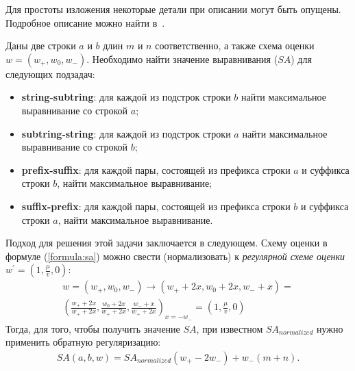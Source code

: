 Для простоты изложения некоторые детали при описании могут быть опущены.
Подробное описание можно найти в~\cite{alex2007semilocal}.


\begin{definition}
Даны две строки $a$ и $b$ длин $m$ и $n$ соответственно, а также схема оценки $w = (w_{+}, w_{0} , w_{-})$. 
Необходимо найти значение выравнивания ($SA$) для следующих подзадач:
\begin{itemize}
\item \textbf{string-subtring}: для каждой из подстрок строки $b$ найти максимальное выравнивание со строкой $a$;
\item \textbf{subtring-string}: для каждой из подстрок строки $a$ найти максимальное выравнивание со строкой $b$;
\item \textbf{prefix-suffix}: для каждой пары, состоящей из префикса строки $a$ и суффикса строки $b$, найти максимальное выравнивание;
\item \textbf{suffix-prefix}: для каждой пары, состоящей из префикса строки $b$ и суффикса строки $a$, найти максимальное выравнивание. 
\end{itemize}
\end{definition}

Подход для решения этой задачи заключается в следующем.
Схему оценки в формуле (\ref{formula:sa}) можно свести (нормализовать) к \emph{регулярной схеме оценки} $w^{'} = (1,\frac{\mu}{v} ,0)$:
\begin{equation}\label{weightNormalization}
    \begin{aligned}
    w = (w_{+}, w_{0} , w_{-}) \xrightarrow{} (w_{+} +2x , w_{0} + 2x , w_{-} + x) =\\ ( \frac{w_{+} +2x}{w_{+} +2x} , \frac {w_{0} + 2x}{w_{+} +2x} , \frac{w_{-} + x}{w_{+} +2x})_{x=-w_{-}} = (1,\frac{\mu}{v} ,0) 
    \end{aligned}
\end{equation}
Тогда, для того, чтобы получить значение $SA$, при известном $SA_{normalized}$ нужно применить обратную регуляризацию:
\begin{equation}
    \begin{aligned}
    SA(a,b,w) = SA_{normalized}  (w_{+} - 2w_{-}) +  w_{-} (m + n).
    \end{aligned}
\end{equation}

